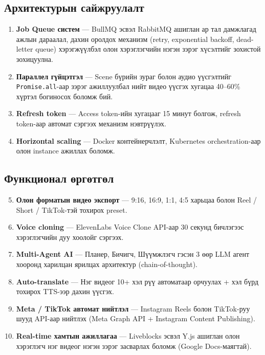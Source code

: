 \subsection{Архитектурын сайжруулалт}
\begin{enumerate}
  \item \textbf{Job Queue систем} --- BullMQ эсвэл RabbitMQ ашиглан ар тал дамжлагад ажлын дараалал, дахин оролдох механизм (retry, exponential backoff, dead-letter queue) хэрэгжүүлбэл олон хэрэглэгчийн нэгэн зэрэг хүсэлтийг зохистой зохицуулна.

  \item \textbf{Параллел гүйцэтгэл} --- Scene бүрийн зураг болон аудио үүсгэлтийг \texttt{Promise.all}-аар зэрэг ажиллуулбал нийт видео үүсгэх хугацаа 40--60\% хүртэл богиносох боломж бий.

  \item \textbf{Refresh token} --- Access token-ийн хугацааг 15 минут болгож, refresh token-аар автомат сэргээх механизм нэвтрүүлэх.

  \item \textbf{Horizontal scaling} --- Docker контейнерчлэлт, Kubernetes orchestration-аар олон instance ажиллах боломж.
\end{enumerate}

\subsection{Функционал өргөтгөл}
\begin{enumerate}
  \setcounter{enumi}{4}
  \item \textbf{Олон форматын видео экспорт} --- 9:16, 16:9, 1:1, 4:5 харьцаа болон Reel / Short / TikTok-тэй тохирох preset.

  \item \textbf{Voice cloning} --- ElevenLabs Voice Clone API-аар 30 секунд бичлэгээс хэрэглэгчийн дуу хоолойг сэргээх.

  \item \textbf{Multi-Agent AI} --- Планер, Бичигч, Шүүмжлэгч гэсэн 3 өөр LLM агент хооронд харилцан ярилцах архитектур (chain-of-thought).

  \item \textbf{Auto-translate} --- Нэг видеог 10+ хэл рүү автоматаар орчуулах + хэл бүрд тохирох TTS-ээр дахин үүсгэх.

  \item \textbf{Meta / TikTok автомат нийтлэл} --- Instagram Reels болон TikTok-руу шууд API-аар нийтлэх (Meta Graph API + Instagram Content Publishing).

  \item \textbf{Real-time хамтын ажиллагаа} --- Liveblocks эсвэл Y.js ашиглан олон хэрэглэгч нэг видеог нэгэн зэрэг засварлах боломж (Google Docs-маягтай).
\end{enumerate}

